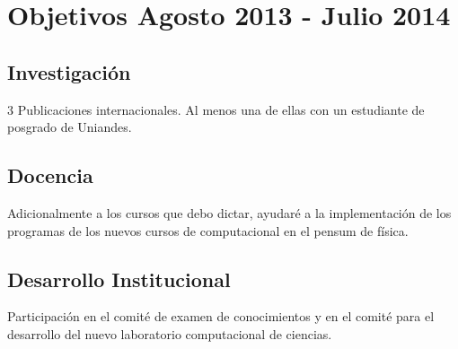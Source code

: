 \documentclass{article}
\begin{document}
\section*{Objetivos Agosto 2013 - Julio 2014}
\subsection*{Investigaci\'on}
3 Publicaciones internacionales. Al menos una de ellas con un estudiante de posgrado de Uniandes.

\subsection*{Docencia}
Adicionalmente a los cursos que debo dictar, ayudar\'e a la implementaci\'on de los programas de los nuevos cursos de computacional en el pensum de f\'isica.

\subsection*{Desarrollo Institucional}
Participaci\'on en el comit\'e de examen de conocimientos y en el comit\'e para el desarrollo del nuevo laboratorio computacional de ciencias.
\end{document}
